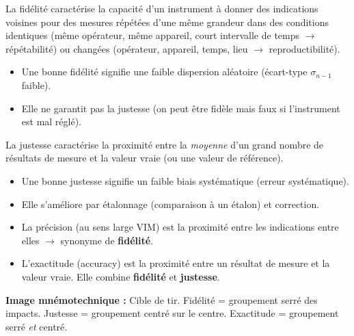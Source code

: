 \documentclass[11pt]{article}
\newcommand{\cle}[1]{{\popxbold\color{popdark}#1}}
\begin{document}
\begin{definition}
La \cle{fidélité} caractérise la capacité d'un instrument à donner des indications voisines pour des mesures répétées d'une même grandeur dans des conditions identiques (même opérateur, même appareil, court intervalle de temps $\rightarrow$ \cle{répétabilité}) ou changées (opérateur, appareil, temps, lieu $\rightarrow$ \cle{reproductibilité}).
\begin{itemize}
\item Une bonne fidélité signifie une faible \cle{dispersion aléatoire} (écart-type $\sigma_{n-1}$ faible).
\item Elle ne garantit pas la justesse (on peut être fidèle mais faux si l'instrument est mal réglé).
\end{itemize}
\end{definition}

\begin{definition}
La \cle{justesse} caractérise la proximité entre la \emph{moyenne} d'un grand nombre de résultats de mesure et la \cle{valeur vraie} (ou une valeur de référence).
\begin{itemize}
\item Une bonne justesse signifie un faible \cle{biais systématique} (erreur systématique).
\item Elle s'améliore par \cle{étalonnage} (comparaison à un étalon) et correction.
\end{itemize}
\end{definition}

\begin{definition}
\begin{itemize}
\item La \cle{précision} (au sens large VIM) est la proximité entre les indications entre elles $\rightarrow$ synonyme de \textbf{fidélité}.
\item L'\cle{exactitude} (accuracy) est la proximité entre un résultat de mesure et la valeur vraie. Elle combine \textbf{fidélité} et \textbf{justesse}.
\end{itemize}
\textbf{Image mnémotechnique :} Cible de tir. Fidélité = groupement serré des impacts. Justesse = groupement centré sur le centre. Exactitude = groupement serré \emph{et} centré.
\end{definition}
\end{document}
